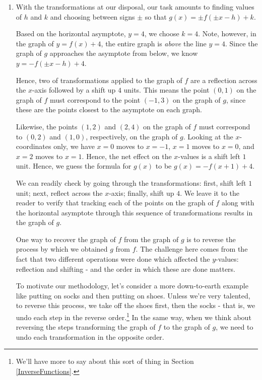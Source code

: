 \documentclass{ximera}
\begin{document}
\begin{example}
\begin{enumerate}
\begin{enumerate}
 \end{enumerate}

 \item With the transformations at our disposal,  our task amounts to finding values of $h$ and $k$ and choosing between signs $\pm$  so that  $g(x) = \pm f( \pm x - h) + k$.  
 
 \smallskip
 
 Based on the horizontal asymptote, $y=4$, we choose $k=4$.  Note, however, in the graph of $y=f(x)+4$, the entire graph is \textit{above} the line $y=4$.  Since the graph of $g$ approaches the asymptote from below, we know  $y=-f(\pm x-h)+4$.  
 
 \smallskip
 
 Hence, two of transformations applied to the graph of $f$ are a reflection across the $x$-axis followed by a shift up $4$ units.  This means the point $(0,1)$ on the graph of $f$ must correspond to the point $(-1,3)$ on the graph of $g$, since these are the points closest to the asymptote on each graph.  
  
  \smallskip
  
Likewise, the points $(1,2)$ and $(2,4)$ on the graph of $f$ must correspond to $(0,2)$ and $(1,0)$, respectively, on the graph of $g$.  Looking at the $x$-coordinates only, we have $x=0$ moves to $x=-1$, $x=1$ moves to $x=0$, and $x=2$ moves to $x=1$.  Hence, the net effect on the $x$-values is a shift left $1$ unit.  Hence, we guess the formula for $g(x)$ to be $g(x) = -f(x+1)+4$.  

\smallskip

We can readily check by going through the transformations:  first, shift left $1$ unit; next,  reflect across the $x$-axis;  finally, shift up $4$.  We leave it to the reader to verify that tracking each of the points on the graph of $f$ along with the horizontal asymptote through this sequence of transformations results in the graph of $g$.  
 
 
 \smallskip
 
 
 One way to recover the graph of $f$ from the graph of $g$ is to reverse the process by which we obtained $g$ from $f$.  The challenge here comes from the fact that two different operations were done which affected the $y$-values:  reflection and shifting - and the order in which these are done matters.  
 
 \smallskip
 
 To motivate our methodology, let's consider a more down-to-earth example like putting on socks and then putting on shoes.  Unless we're very talented,  to reverse this process, we take off the shoes first, then the socks - that is, we undo each step in the reverse order.\footnote{We'll have more to say about this sort of thing in Section \ref{InverseFunctions}.}  In the same way, when we think about reversing the steps transforming the graph of $f$ to the graph of $g$, we need to undo each transformation in the opposite order.  
 

\end{enumerate}
\end{example}
\end{document}
